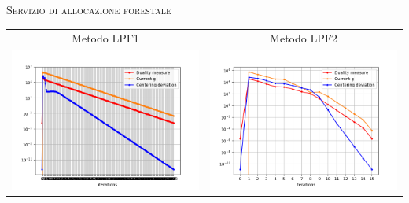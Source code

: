 \begin{frame}{\textsc{\LARGE \textcolor{iris}{Servizio di allocazione forestale}}}
	\centering
	\begin{tabular}{c@{}c}
		\small{Metodo LPF1} & \small{Metodo LPF2} \\
		\includegraphics[scale = 0.33]{for_LPF1}
		&\includegraphics[scale = 0.33]{for_LPF2}\\ 
	\end{tabular}
\end{frame}

